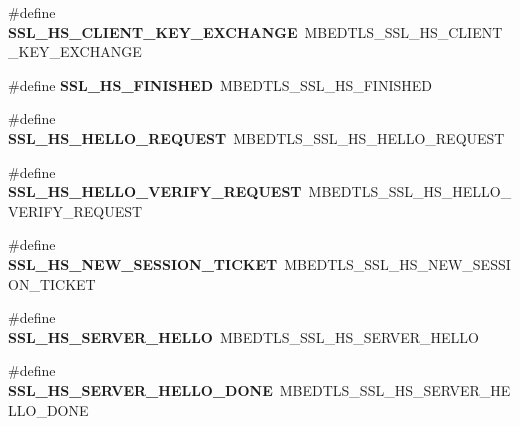 \begin{DoxyCompactItemize}
\item 
\mbox{\label{compat-1_83_8h_a3f20623ea264473b438e96339278c16b}} 
\#define {\bfseries S\+S\+L\+\_\+\+H\+S\+\_\+\+C\+L\+I\+E\+N\+T\+\_\+\+K\+E\+Y\+\_\+\+E\+X\+C\+H\+A\+N\+GE}~M\+B\+E\+D\+T\+L\+S\+\_\+\+S\+S\+L\+\_\+\+H\+S\+\_\+\+C\+L\+I\+E\+N\+T\+\_\+\+K\+E\+Y\+\_\+\+E\+X\+C\+H\+A\+N\+GE
\item 
\mbox{\label{compat-1_83_8h_a47bcc86840fcbc68b5a70bfca774258a}} 
\#define {\bfseries S\+S\+L\+\_\+\+H\+S\+\_\+\+F\+I\+N\+I\+S\+H\+ED}~M\+B\+E\+D\+T\+L\+S\+\_\+\+S\+S\+L\+\_\+\+H\+S\+\_\+\+F\+I\+N\+I\+S\+H\+ED
\item 
\mbox{\label{compat-1_83_8h_afda93251f735deb8569698986df4bb95}} 
\#define {\bfseries S\+S\+L\+\_\+\+H\+S\+\_\+\+H\+E\+L\+L\+O\+\_\+\+R\+E\+Q\+U\+E\+ST}~M\+B\+E\+D\+T\+L\+S\+\_\+\+S\+S\+L\+\_\+\+H\+S\+\_\+\+H\+E\+L\+L\+O\+\_\+\+R\+E\+Q\+U\+E\+ST
\item 
\mbox{\label{compat-1_83_8h_a63e0eb4bb8bc2b16e57605cd316c5649}} 
\#define {\bfseries S\+S\+L\+\_\+\+H\+S\+\_\+\+H\+E\+L\+L\+O\+\_\+\+V\+E\+R\+I\+F\+Y\+\_\+\+R\+E\+Q\+U\+E\+ST}~M\+B\+E\+D\+T\+L\+S\+\_\+\+S\+S\+L\+\_\+\+H\+S\+\_\+\+H\+E\+L\+L\+O\+\_\+\+V\+E\+R\+I\+F\+Y\+\_\+\+R\+E\+Q\+U\+E\+ST
\item 
\mbox{\label{compat-1_83_8h_a63adfe04136af9f3990b24562569d054}} 
\#define {\bfseries S\+S\+L\+\_\+\+H\+S\+\_\+\+N\+E\+W\+\_\+\+S\+E\+S\+S\+I\+O\+N\+\_\+\+T\+I\+C\+K\+ET}~M\+B\+E\+D\+T\+L\+S\+\_\+\+S\+S\+L\+\_\+\+H\+S\+\_\+\+N\+E\+W\+\_\+\+S\+E\+S\+S\+I\+O\+N\+\_\+\+T\+I\+C\+K\+ET
\item 
\mbox{\label{compat-1_83_8h_aad10d88b523225e34a788bb2553d2593}} 
\#define {\bfseries S\+S\+L\+\_\+\+H\+S\+\_\+\+S\+E\+R\+V\+E\+R\+\_\+\+H\+E\+L\+LO}~M\+B\+E\+D\+T\+L\+S\+\_\+\+S\+S\+L\+\_\+\+H\+S\+\_\+\+S\+E\+R\+V\+E\+R\+\_\+\+H\+E\+L\+LO
\item 
\mbox{\label{compat-1_83_8h_a56bb1fe1c001cd5905e26a7ad6cee303}} 
\#define {\bfseries S\+S\+L\+\_\+\+H\+S\+\_\+\+S\+E\+R\+V\+E\+R\+\_\+\+H\+E\+L\+L\+O\+\_\+\+D\+O\+NE}~M\+B\+E\+D\+T\+L\+S\+\_\+\+S\+S\+L\+\_\+\+H\+S\+\_\+\+S\+E\+R\+V\+E\+R\+\_\+\+H\+E\+L\+L\+O\+\_\+\+D\+O\+NE
\item 

\end{DoxyCompactItemize}
